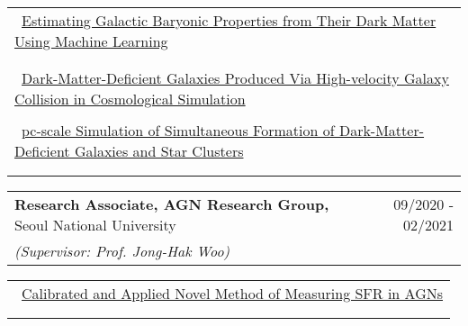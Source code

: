\documentclass[letterpaper,10pt]{article}
\newcommand{\tabitem}{{\textbullet}~}
\begin{document}
\begin{center}
\begin{tabular*}{0.97\textwidth}{l}
  \tabitem \underline{Estimating Galactic Baryonic Properties from Their Dark Matter Using Machine Learning}\\
  \hspace{5pt}{\small - Applied trained machine to the cosmological simulation halo catalog (IllustrisTNG simulation)}\\
  \hspace{5pt}{\small - Computed and compared two-point correlation function in IllustrisTNG halo catalog and machine-predicted halo catalog}\\
  \tabitem \underline{Dark-Matter-Deficient Galaxies Produced Via High-velocity Galaxy Collision in Cosmological Simulation}\\
  \hspace{5pt}{\small - Studied IllustrisTNG catalog to find high-speed collision events of dwarf galaxies to compare with idealized simulation}\\
  \tabitem \underline{pc-scale Simulation of Simultaneous Formation of Dark-Matter-Deficient Galaxies and Star Clusters}\\
  \hspace{5pt}{\small - Ran a suite of 1.25 pc-resolution galaxy collision simulations with different merger configuration and feedback schemes}\\
  \hspace{5pt}{\small - Resolved and tracked the formation process of dark-matter-deficient galaxies and massive star clusters}\\
\end{tabular*}
\end{center}


\vspace{-15pt}


\begin{center}
\begin{tabular*}{0.97\textwidth}{l@{\extracolsep{\fill}}r}
    \textbf{Research Associate, AGN Research Group,} Seoul National University & 
    09/2020 - 02/2021\\
    \textit{\small (Supervisor: Prof. Jong-Hak Woo)}
\end{tabular*}
\end{center}

\vspace{-20pt}

\begin{center}
\begin{tabular*}{0.97\textwidth}{l}
  \tabitem \underline{Calibrated and Applied Novel Method of Measuring SFR in AGNs}\\
  \hspace{5pt}{\small - Tested Oxygen emission line flux as SFR indicator by statistically analyzing SDSS spectroscopy data and IR surveys}\\
  \hspace{5pt}{\small - Investigated correlation between gas outflow strength from AGNs and star formation of host galaxies}\\
\end{tabular*}
\end{center}
\end{document}
